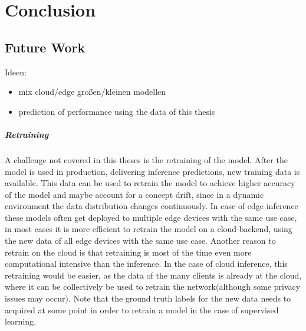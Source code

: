 \chapter{Conclusion}
\label{chap:conclusion}
\section{Future Work}
Ideen:
\begin{itemize}
    \item mix cloud/edge großen/kleinen modellen
    \item prediction of performance using the data of this thesis
\end{itemize}

\paragraph{Retraining}
A challenge not covered in this theses  is the retraining of the model. After the model is used in production, delivering inference predictions, new training data is available. This data can be used to retrain the model to achieve higher accuracy of the model and maybe account for a concept drift, since in a dynamic environment the data distribution changes continuously.
In case of edge inference these models often get deployed to multiple edge devices with the same use case, in most cases it is more efficient to retrain the model on a cloud-backend, using the new data of all edge devices with the same use case. Another reason to retrain on the cloud is that retraining is most of the time even more computational intensive than the inference.
In the case of cloud inference, this retraining would be easier, as the data of the many clients is already at the cloud, where it can be collectively be used to retrain the network(although some privacy issues may occur).
Note that the ground truth labels for the new data needs to acquired at some point in order to retrain a model in the case of supervised learning.
\endinput 
